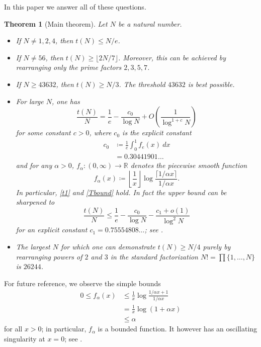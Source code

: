 \documentclass[12pt,a4paper,reqno]{amsart}
\numberwithin{equation}{section}
\theoremstyle{plain}
\newtheorem{theorem}{Theorem}[section]
\theoremstyle{definition}
\newcommand\R{\mathbb{R}}
\begin{document}
In this paper we answer all of these questions.

\begin{theorem}[Main theorem]\label{main} Let $N$ be a natural number.
\begin{itemize}
\item[(i)] If $N \neq 1,2,4$, then $t(N) \leq N/e$.
\item[(ii)]  If $N \neq 56$, then $t(N) \geq \lfloor 2N/7 \rfloor$.  Moreover, this can be achieved by rearranging only the prime factors $2,3,5,7$.
\item[(iii)]  If $N \geq 43632$, then $t(N) \geq N/3$.  The threshold $43632$ is best possible.
\item[(iv)]  For large $N$, one has
  \begin{equation}\label{asym}
    \frac{t(N)}{N} = \frac{1}{e} - \frac{c_0}{\log N} + O\left( \frac{1}{\log^{1+c} N} \right)
  \end{equation}
for some constant $c>0$, where $c_0$ is the explicit constant
\begin{equation}\label{c0-def}
  \begin{split}
  c_0 &\coloneqq \frac{1}{e} \int_0^1 f_e(x)\ dx \\
  &= 0.30441901\dots
\end{split}
\end{equation}
and for any $\alpha>0$, $f_\alpha \colon (0,\infty) \to \R$ denotes the piecewise smooth function
\begin{equation}\label{falpha-def} 
  f_\alpha(x) \coloneqq \left\lfloor \frac{1}{x} \right\rfloor \log \frac{\lceil 1/\alpha x \rceil}{1/\alpha x}.
\end{equation}
In particular, \eqref{t1} and \eqref{Tbound} hold.  In fact the upper bound can be sharpened to
\begin{equation}\label{tna} 
  \frac{t(N)}{N} \leq \frac{1}{e} - \frac{c_0}{\log N} - \frac{c_1+o(1)}{\log^2 N} 
\end{equation}
for an explicit constant $c_1=0.75554808\dots$; see .
\item[(v)]  The largest $N$ for which one can demonstrate $t(N) \geq N/4$ purely by rearranging powers of $2$ and $3$ in the standard factorization $N! = \prod \{1,\dots,N\}$ is $26244$.
\end{itemize}
\end{theorem}

For future reference, we observe the simple bounds
\begin{equation}\label{falpha-bound}
 \begin{split}
   0 \leq f_\alpha(x) &\leq \frac{1}{x} \log \frac{1/\alpha x+1}{1/\alpha x}\\
&= \frac{1}{x} \log\left( 1 + \alpha x \right) \\
&\leq \alpha
\end{split}
\end{equation}
for all $x>0$; in particular, $f_\alpha$ is a bounded function.  It however has an oscillating singularity at $x=0$; see .
\end{document}
